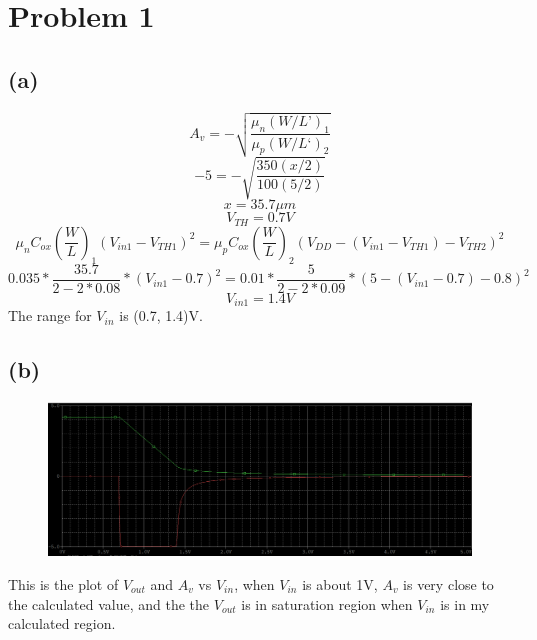 \documentclass[12pt]{article}
\begin{document}
\newpage
\section{Problem 1}
\subsection{(a)}
$$A_v=-\sqrt{\frac{\mu_n(W/L’)_1}{\mu_p(W/L‘)_2}}$$
$$-5=-\sqrt{\frac{350(x/2)}{100(5/2)}}$$
$$x=35.7\mu m$$
$$V_{TH}=0.7V$$
$$\mu_nC_{ox}(\frac{W}{L})_1(V_{in1}-V_{TH1})^2=\mu_pC_{ox}(\frac{W}{L})_2(V_{DD}-(V_{in1}-V_{TH1})-V_{TH2})^2$$
$$0.035*\frac{35.7}{2-2*0.08}*(V_{in1}-0.7)^2=0.01*\frac{5}{2-2*0.09}*(5-(V_{in1}-0.7)-0.8)^2$$
$$V_{in1}=1.4V$$
The range for $V_{in}$ is (0.7, 1.4)V.
\subsection{(b)}
\begin{figure}[H]
\centering
\includegraphics[scale=0.25]{P1.png}
\end{figure}
This is the plot of $V_{out}$ and $A_v$ vs $V_{in}$, when $V_{in}$ is about 1V, $A_v$ is very close to the calculated value, and the the $V_{out}$ is in saturation region when $V_{in}$ is in my calculated region.
\end{document}
